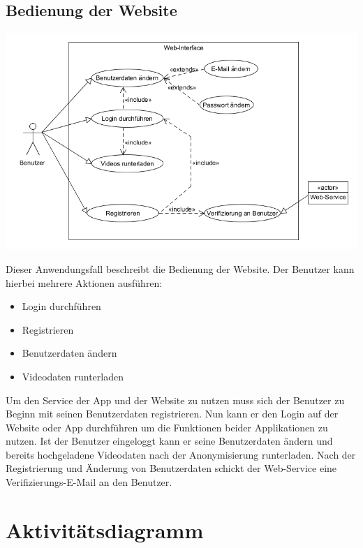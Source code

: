 \subsection{Bedienung der Website}
\begin{center}
\includegraphics[width=1\textwidth]{subtopicsFuncspec/Res/systemModels/WebsiteAWFDiagram.png}
\end{center}	
Dieser Anwendungsfall beschreibt die Bedienung der Website.
Der Benutzer kann hierbei mehrere Aktionen ausführen:
\begin{itemize}
\item Login durchführen
\item Registrieren
\item Benutzerdaten ändern
\item Videodaten runterladen
\end{itemize}
Um den Service der App und der Website zu nutzen muss sich der Benutzer zu Beginn mit seinen Benutzerdaten registrieren. 
Nun kann er den Login auf der Website oder App durchführen um die Funktionen beider Applikationen zu nutzen. 
Ist der Benutzer eingeloggt kann er seine Benutzerdaten ändern und bereits hochgeladene Videodaten nach der Anonymisierung runterladen.
Nach der Registrierung und Änderung von Benutzerdaten schickt der Web-Service eine Verifizierungs-E-Mail an den Benutzer.
\section{Aktivitätsdiagramm}
